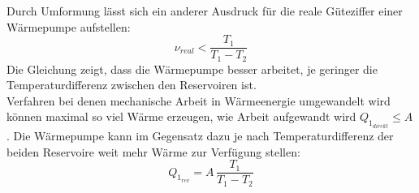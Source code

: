 Durch Umformung lässt sich ein anderer Ausdruck für die reale Güteziffer einer Wärmepumpe aufstellen:
\begin{equation}\label{eqn:guetezifferReal}
    ν_{real} < \frac{T_1}{T_1 - T_2}
\end{equation}
Die Gleichung zeigt, dass die Wärmepumpe besser arbeitet, je geringer die Temperaturdifferenz zwischen den 
Reservoiren ist.\\
Verfahren bei denen mechanische Arbeit in Wärmeenergie umgewandelt wird können maximal so viel Wärme erzeugen,
wie Arbeit aufgewandt wird $Q_{1_{direkt}} \leq A$. 
Die Wärmepumpe kann im Gegensatz dazu je nach Temperaturdifferenz der beiden Reservoire weit mehr Wärme
zur Verfügung stellen:
\begin{equation}
    Q_{1_{rev}} = A\, \frac{T_1}{T_1 - T_2}
\end{equation}

\cite{sample}
